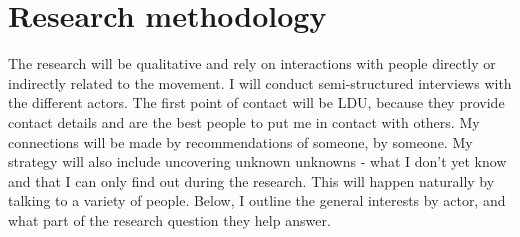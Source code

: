 \documentclass{article}[12pt]
\begin{document}
\section{Research methodology}

The research will be qualitative and rely on interactions with people directly or indirectly related to the movement. 
I will conduct semi-structured interviews with the different actors. The first point of contact will be LDU, because they provide contact details and are the best people to put me in contact with others. My connections will be made by recommendations of someone, by someone. 
My strategy will also include uncovering unknown unknowns - what I don't yet know and that I can only find out during the research. This will happen naturally by talking to a variety of people. Below, I outline the general interests by actor, and what part of the research question they help answer.
\end{document}
